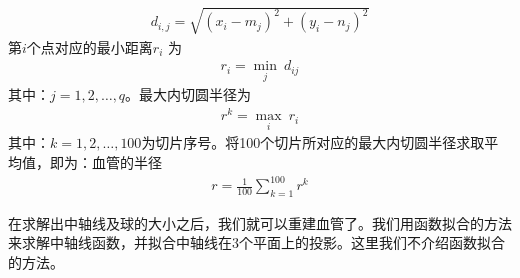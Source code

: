         \begin{align*}
        d_{i,j} = \sqrt{(x_i-m_j)^2+(y_i-n_j)^2}
        \end{align*}
        第$i$个点对应的最小距离$r_i$ 为
        \begin{align*}
        r_i = \min_j\ d_{ij}
        \end{align*}
        其中：$j = 1,2,\dots,q$。最大内切圆半径为
        \begin{align*}
        r^k = \max_{i}\ r_i
        \end{align*}
        其中：$k = 1,2,\dots,100$为切片序号。将100个切片所对应的最大内切圆半径求取平均值，即为：血管的半径
        \begin{align*}
        r = \frac{1}{100}\sum_{k=1}^{100} r^k
        \end{align*}
        \par
        在求解出中轴线及球的大小之后，我们就可以重建血管了。我们用函数拟合的方法来求解中轴线函数，并拟合中轴线在3个平面上的投影。这里我们不介绍函数拟合的方法。

